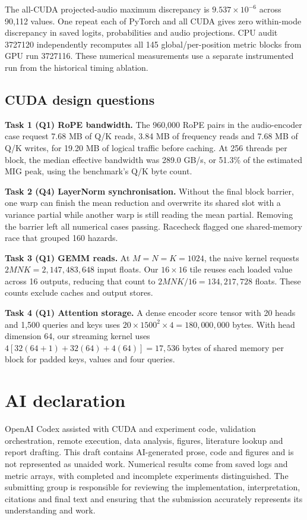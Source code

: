 \documentclass{article}
\begin{document}
The all-CUDA projected-audio maximum discrepancy is $9.537\times10^{-6}$ across 90,112 values. One repeat each of PyTorch and all CUDA gives zero within-mode discrepancy in saved logits, probabilities and audio projections. CPU audit 3727120 independently recomputes all 145 global/per-position metric blocks from GPU run 3727116. These numerical measurements use a separate instrumented run from the historical timing ablation.

\clearpage

\clearpage

\subsection{CUDA design questions}

\textbf{Task 1 (Q1) RoPE bandwidth.} The 960,000 RoPE pairs in the audio-encoder case request 7.68 MB of Q/K reads, 3.84 MB of frequency reads and 7.68 MB of Q/K writes, for 19.20 MB of logical traffic before caching. At 256 threads per block, the median effective bandwidth was 289.0 GB/s, or 51.3\% of the estimated MIG peak, using the benchmark's Q/K byte count.

\textbf{Task 2 (Q4) LayerNorm synchronisation.} Without the final block barrier, one warp can finish the mean reduction and overwrite its shared slot with a variance partial while another warp is still reading the mean partial. Removing the barrier left all numerical cases passing. Racecheck flagged one shared-memory race that grouped 160 hazards.

\textbf{Task 3 (Q1) GEMM reads.} At $M=N=K=1024$, the naive kernel requests $2MNK=2{,}147{,}483{,}648$ input floats. Our $16\times16$ tile reuses each loaded value across 16 outputs, reducing that count to $2MNK/16=134{,}217{,}728$ floats. These counts exclude caches and output stores.

\textbf{Task 4 (Q1) Attention storage.} A dense encoder score tensor with 20 heads and 1,500 queries and keys uses $20\times1500^2\times4=180{,}000{,}000$ bytes. With head dimension 64, our streaming kernel uses $4[32(64+1)+32(64)+4(64)]=17{,}536$ bytes of shared memory per block for padded keys, values and four queries.


\newpage
\section*{AI declaration}
OpenAI Codex assisted with CUDA and experiment code, validation orchestration, remote execution, data analysis, figures, literature lookup and report drafting. This draft contains AI-generated prose, code and figures and is not represented as unaided work. Numerical results come from saved logs and metric arrays, with completed and incomplete experiments distinguished. The submitting group is responsible for reviewing the implementation, interpretation, citations and final text and ensuring that the submission accurately represents its understanding and work.
\end{document}
